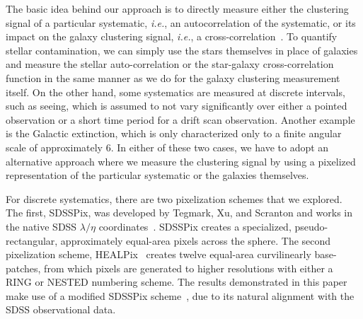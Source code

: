 \documentclass[11pt,twoside]{article}
\begin{document}
The basic idea behind our approach is to directly measure either the clustering signal of a particular systematic, \textit{i.e.}, an autocorrelation of the systematic, or its impact on the galaxy clustering signal, \textit{i.e.}, a cross-correlation~\cite[see, \textit{e.g.},][]{Scranton02}. To quantify stellar contamination, we can simply use the stars themselves in place of galaxies and measure the stellar auto-correlation or the star-galaxy cross-correlation function in the same manner as we do for the galaxy clustering measurement itself. On the other hand, some systematics are measured at discrete intervals, such as seeing, which is assumed to not vary significantly over either a pointed observation or a short time period for a drift scan observation. Another example is the Galactic extinction, which is only characterized only to a finite angular scale of approximately 6\arcmin. In either of these two cases, we have to adopt an alternative approach where we measure the clustering signal by using a pixelized representation of the particular systematic or the galaxies themselves.

For discrete systematics, there are two pixelization schemes that we explored. The first, SDSSPix, was developed by Tegmark, Xu, and Scranton and works in the native SDSS $\lambda/\eta$ coordinates~\citep{Stoughton02}. SDSSPix creates a specialized, pseudo-rectangular, approximately equal-area pixels across the sphere. The second pixelization scheme, HEALPix~\citep{Gorski05} creates twelve equal-area curvilinearly base-patches, from which pixels are generated to higher resolutions with either a RING or NESTED numbering scheme. The results demonstrated in this paper make use of a modified SDSSPix scheme~\citep{Ross06}, due to its natural alignment with the SDSS observational data.

\end{document}
